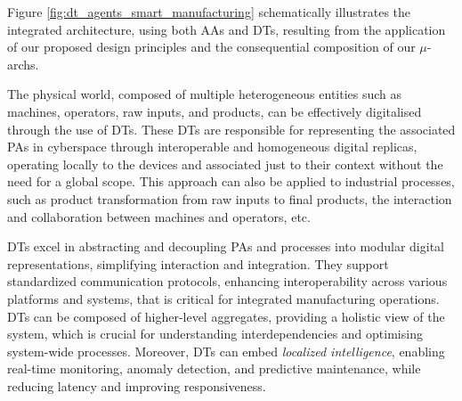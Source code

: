 Figure \ref{fig:dt_agents_smart_manufacturing} schematically illustrates the integrated architecture, using both AAs and DTs, resulting from the application of our proposed design principles and the consequential composition of our $\mu$-archs. 

The physical world, composed of multiple heterogeneous entities such as machines, operators, raw inputs, and products, can be effectively digitalised through the use of DTs.
These DTs are responsible for representing the associated PAs in cyberspace through interoperable and homogeneous digital replicas, operating locally to the devices and associated just to their context without the need for a global scope.
This approach can also be applied to industrial processes, such as product transformation from raw inputs to final products, the interaction and collaboration between machines and operators, etc.

DTs excel in abstracting and decoupling PAs and processes into modular digital representations, simplifying interaction and integration. They support standardized communication protocols, enhancing interoperability across various platforms and systems, that is critical for integrated manufacturing operations. DTs can be composed of higher-level aggregates, providing a holistic view of the system, which is crucial for understanding interdependencies and optimising system-wide processes.
%
Moreover, DTs can embed \emph{localized intelligence}, enabling real-time monitoring, anomaly detection, and predictive maintenance, while reducing latency and improving responsiveness.

